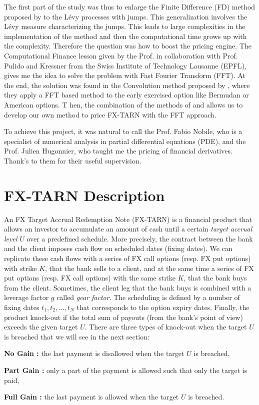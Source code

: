 The first part of the study was thus to enlarge the Finite Difference (FD) method proposed by \citeauthor{LS15} to the L\'evy processes with jumps. This generalization involves the L\'evy measure characterizing the jumps. This leads to large complexities in the implementation of the method and then the computational time grows up with the complexity. Therefore the question was how to boost the pricing engine. The Computational Finance lesson given by the Prof. \citeauthor{Nob15} in collaboration with Prof. Pulido and Kressner from the Swiss Institute of Technology Lausanne (EPFL), gives me the idea to solve the problem with Fast Fourier Transform (FFT). At the end, the solution was found in the Convolution method proposed by \citeauthor{Lor+08} \citeyearpar{Lor+08}, where they apply a FFT based method to the early exercised option like Bermudan or American options. T hen, the combination of the methods of \citeauthor{LS15} and \citeauthor{Lor+08} allows us to develop our own method to price FX-TARN with the FFT approach.

To achieve this project, it was natural to call the Prof. Fabio Nobile, who is a specialist of numerical analysis in partial differential equations (PDE), and the Prof. Julien Hugonnier, who taught me the pricing of financial derivatives. Thank's to them for their useful supervision.

\section{FX-TARN Description}
\label{sec:intro:description}
An FX Target Accrual Redemption Note (FX-TARN) is a financial product that allows an investor to accumulate an amount of cash until a certain \textit{target accrual level} $U$ over a predefined schedule. More precisely, the contract between the bank and the client imposes cash flow on scheduled dates (fixing dates). We can replicate these cash flows with a series of FX call options (resp. FX put options) with strike $K$, that the bank sells to a client, and at the same time a series of FX put options (resp. FX call options) with the same strike $K$, that the bank buys from the client. Sometimes, the client leg that the bank buys is combined with a leverage factor $g$ called \textit{gear factor}. The scheduling is defined by a number of fixing dates $t_1,t_2,\ldots,t_N$ that corresponds to the option expiry dates. Finally, the product knock-out if the total sum of payouts (from the bank's point of view) exceeds the given target $U$. There are three types of knock-out when the target $U$ is breached that we will see in the next section:
\begin{my_list_item}
\item \textbf{No Gain :} the last payment is disallowed when the target $U$ is breached,
\item \textbf{Part Gain :} only a part of the payment is allowed such that only the target is paid,
\item \textbf{Full Gain :} the last payment is allowed when the target $U$ is breached. 
\end{my_list_item}

